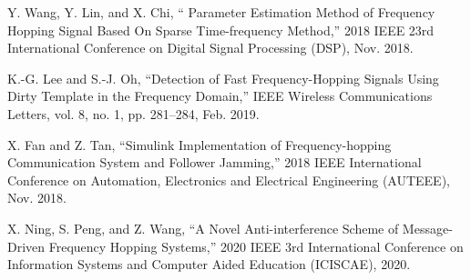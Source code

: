 \documentclass[conference]{IEEEtran}
\begin{document}
\begin{thebibliography}{00}

 Y. Wang, Y. Lin, and X. Chi, `` Parameter Estimation Method of Frequency Hopping Signal Based On Sparse Time-frequency Method,'' 2018 IEEE 23rd International Conference on Digital Signal Processing (DSP), Nov. 2018.

 K.-G. Lee and S.-J. Oh, “Detection of Fast Frequency-Hopping Signals Using Dirty Template in the Frequency Domain,” IEEE Wireless Communications Letters, vol. 8, no. 1, pp. 281–284, Feb. 2019.

 X. Fan and Z. Tan, “Simulink Implementation of Frequency-hopping Communication System and Follower Jamming,” 2018 IEEE International Conference on Automation, Electronics and Electrical Engineering (AUTEEE), Nov. 2018. 

 X. Ning, S. Peng, and Z. Wang, “A Novel Anti-interference Scheme of Message-Driven Frequency Hopping Systems,” 2020 IEEE 3rd International Conference on Information Systems and Computer Aided Education (ICISCAE), 2020. 

\end{thebibliography}
\end{document}

